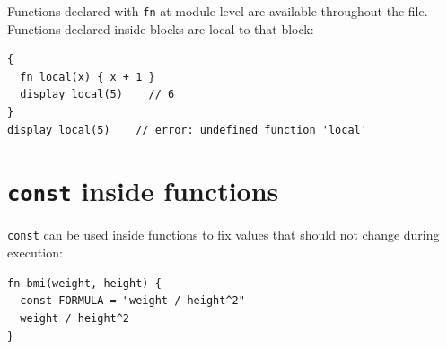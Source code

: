 Functions declared with \lstinline{fn} at module level are available
throughout the file. Functions declared inside blocks are local to that
block:

\begin{lstlisting}
{
  fn local(x) { x + 1 }
  display local(5)    // 6
}
display local(5)    // error: undefined function 'local'
\end{lstlisting}

\section{\texttt{const} inside functions}

\lstinline{const} can be used inside functions to fix values that should
not change during execution:

\begin{lstlisting}
fn bmi(weight, height) {
  const FORMULA = "weight / height^2"
  weight / height^2
}
\end{lstlisting}
